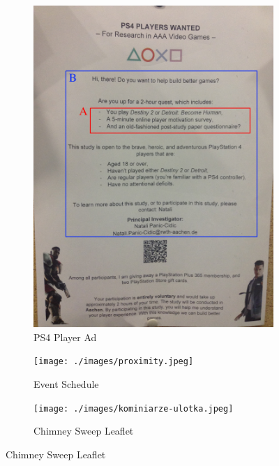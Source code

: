 \documentclass[a4paper,11pt,oneside]{scrreprt}
\begin{document}
\begin{figure}[H]
	\centering
	\begin{subfigure}{.5\textwidth}
		\centering
		\includegraphics[clip, trim=0cm 0cm 0cm 0cm, scale=0.13]{./images/recruitment2.jpeg}
		\caption{PS4 Player Ad}
	\end{subfigure}%
	\begin{subfigure}{.5\textwidth}
		\centering
		\texttt{[image: ./images/proximity.jpeg]}
		\caption{Event Schedule}
	\end{subfigure}
	\begin{subfigure}{.5\textwidth}
		\centering
		\texttt{[image: ./images/kominiarze-ulotka.jpeg]}
		\caption{Chimney Sweep Leaflet}
	\end{subfigure}
	\label{fig:test}
\end{figure}
\end{document}
